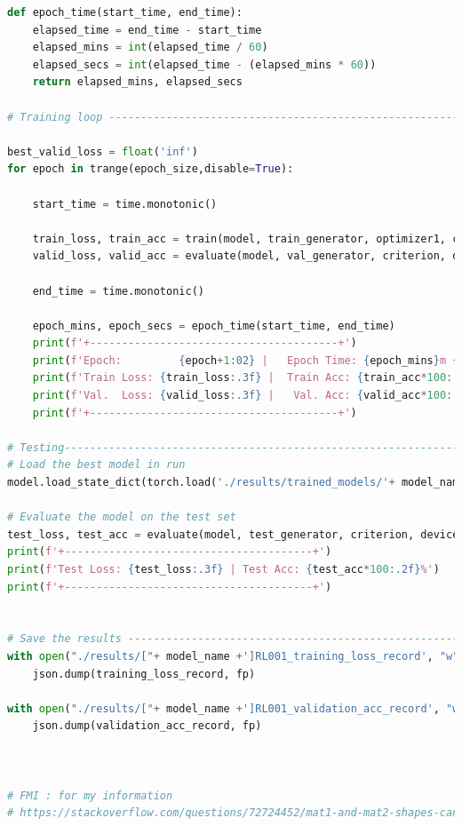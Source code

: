 \documentclass[3p,times,procedia]{elsarticle}
\begin{document}
\begin{lstlisting}[language=Python]
def epoch_time(start_time, end_time):
    elapsed_time = end_time - start_time
    elapsed_mins = int(elapsed_time / 60)
    elapsed_secs = int(elapsed_time - (elapsed_mins * 60))
    return elapsed_mins, elapsed_secs

# Training loop ---------------------------------------------------------------------------------------------------------------------------------------#

best_valid_loss = float('inf')
for epoch in trange(epoch_size,disable=True):

    start_time = time.monotonic()

    train_loss, train_acc = train(model, train_generator, optimizer1, criterion, device)
    valid_loss, valid_acc = evaluate(model, val_generator, criterion, device, sv=0)

    end_time = time.monotonic()

    epoch_mins, epoch_secs = epoch_time(start_time, end_time)
    print(f'+---------------------------------------+')
    print(f'Epoch:         {epoch+1:02} |   Epoch Time: {epoch_mins}m {epoch_secs}s')
    print(f'Train Loss: {train_loss:.3f} |  Train Acc: {train_acc*100:.2f} %')
    print(f'Val.  Loss: {valid_loss:.3f} |   Val. Acc: {valid_acc*100:.2f} %')
    print(f'+---------------------------------------+')

# Testing-----------------------------------------------------------------------------------------------------------------------------------------------#
# Load the best model in run
model.load_state_dict(torch.load('./results/trained_models/'+ model_name+'[RL001].pt'))

# Evaluate the model on the test set
test_loss, test_acc = evaluate(model, test_generator, criterion, device, sv=0)
print(f'+---------------------------------------+')
print(f'Test Loss: {test_loss:.3f} | Test Acc: {test_acc*100:.2f}%')
print(f'+---------------------------------------+')


# Save the results ----------------------------------------------------------------------------------------------------------------------------------#
with open("./results/["+ model_name +']RL001_training_loss_record', "w") as fp:
    json.dump(training_loss_record, fp)

with open("./results/["+ model_name +']RL001_validation_acc_record', "w") as fp:
    json.dump(validation_acc_record, fp)



# FMI : for my information
# https://stackoverflow.com/questions/72724452/mat1-and-mat2-shapes-cannot-be-multiplied-128x4-and-128x64

\end{lstlisting}
\end{document}
